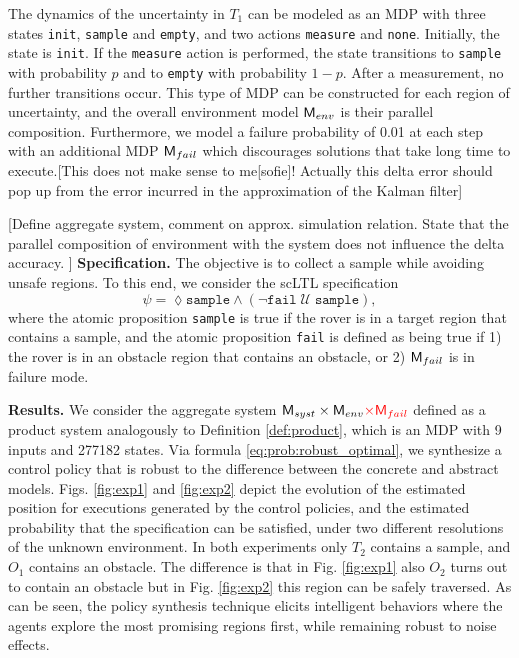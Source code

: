 \documentclass{ifacconf}
\newcommand{\red}[1]{{\color{red} #1}}
\begin{document}
The dynamics of the uncertainty in $T_1$ can be modeled as an MDP with three states \texttt{init}, \texttt{sample} and \texttt{empty}, and two actions \texttt{measure} and \texttt{none}. Initially, the state is \texttt{init}. If the \texttt{measure} action is performed, the state transitions to \texttt{sample} with probability $p$ and to \texttt{empty} with probability $1-p$. After a measurement, no further transitions occur. This type of MDP can be constructed for each region of uncertainty, and the overall environment model $\mathsf{M}_{env}$ is their parallel composition. \red{Furthermore, we model a failure probability of 0.01 at each step with an additional MDP $\mathsf{M}_{fail}$ which discourages solutions that take long time to execute.[This does not make sense to me[sofie]! Actually this delta error should pop up from the error incurred in the approximation of the Kalman filter]}

\red{[Define aggregate system, comment on approx. simulation relation. State that the parallel composition of environment with the system does  not influence the delta accuracy. ]}
\textbf{Specification.} The objective is to collect a sample while avoiding unsafe regions. To this end, we consider the scLTL specification
\begin{equation}
  \psi = \lozenge \texttt{sample} \land \left( \lnot \texttt{fail} \; \mathcal {U} \; \texttt{sample} \right),
\end{equation}
where the atomic proposition \texttt{sample} is true if the rover is in a target region that contains a sample, and the atomic proposition \texttt{fail} is defined as being true if 1) the rover is in an obstacle region that contains an obstacle, or 2) $\mathsf{M}_{fail}$ is in failure mode.

\textbf{Results.} We consider the aggregate system $\MDP_{syst} \times \MDP_{env} \red{\times \MDP_{fail}}$ defined as a product system analogously to Definition \ref{def:product}, which is an MDP with 9 inputs and 277182 states. Via formula \eqref{eq:prob:robust_optimal}, we synthesize a control policy that is robust to the difference between the concrete and abstract models. Figs. \ref{fig:exp1} and \ref{fig:exp2} depict the evolution of the estimated position for executions generated by the control policies, and the estimated probability that the specification can be satisfied, under two different resolutions of the unknown environment. In both experiments only $T_2$ contains a sample, and $O_1$ contains an obstacle. The difference is that in Fig. \ref{fig:exp1} also $O_2$ turns out to contain an obstacle but in Fig. \ref{fig:exp2} this region can be safely traversed. As can be seen, the policy synthesis technique elicits intelligent behaviors where the agents explore the most promising regions first, while remaining robust to noise effects.
\end{document}
